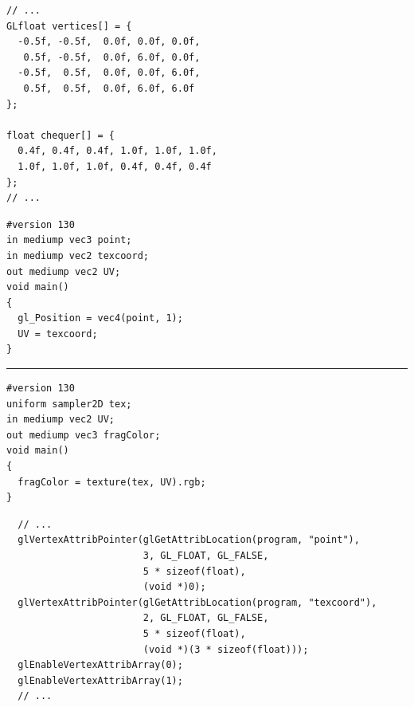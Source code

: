 \documentclass[calcdimensions,landscape,letterpaper]{powersem}
\newcommand{\thecurrentheading}{}
\newcommand{\heading}[1]{\renewcommand{\thecurrentheading}{#1}}
\begin{document}
\begin{slide}
    \heading{Texture Coordinates and Data}
    \begin{center}
        \begin{minipage}[c]{.7\textwidth}
            \begin{verbatim}
// ...
GLfloat vertices[] = {
  -0.5f, -0.5f,  0.0f, 0.0f, 0.0f,
   0.5f, -0.5f,  0.0f, 6.0f, 0.0f,
  -0.5f,  0.5f,  0.0f, 0.0f, 6.0f,
   0.5f,  0.5f,  0.0f, 6.0f, 6.0f
};

float chequer[] = {
  0.4f, 0.4f, 0.4f, 1.0f, 1.0f, 1.0f,
  1.0f, 1.0f, 1.0f, 0.4f, 0.4f, 0.4f
};
// ...
            \end{verbatim}
        \end{minipage}
    \end{center}
\end{slide}

\begin{slide}
    \heading{Shaders using Texture}
    \begin{center}
        \begin{minipage}[c]{.5\textwidth}
            \begin{verbatim}
#version 130
in mediump vec3 point;
in mediump vec2 texcoord;
out mediump vec2 UV;
void main()
{
  gl_Position = vec4(point, 1);
  UV = texcoord;
}
            \end{verbatim}
            \vspace{-10pt}
            \rule{4cm}{0.4pt}
            \begin{verbatim}
#version 130
uniform sampler2D tex;
in mediump vec2 UV;
out mediump vec3 fragColor;
void main()
{
  fragColor = texture(tex, UV).rgb;
}
            \end{verbatim}
        \end{minipage}
    \end{center}
\end{slide}

\begin{slide}
    \heading{Multiple Vertex Attributes}
    \begin{center}
        \begin{minipage}[c]{.95\textwidth}
            \begin{verbatim}
  // ...
  glVertexAttribPointer(glGetAttribLocation(program, "point"),
                        3, GL_FLOAT, GL_FALSE,
                        5 * sizeof(float),
                        (void *)0);
  glVertexAttribPointer(glGetAttribLocation(program, "texcoord"),
                        2, GL_FLOAT, GL_FALSE,
                        5 * sizeof(float),
                        (void *)(3 * sizeof(float)));
  glEnableVertexAttribArray(0);
  glEnableVertexAttribArray(1);
  // ...
            \end{verbatim}
        \end{minipage}
    \end{center}
\end{slide}
\end{document}

